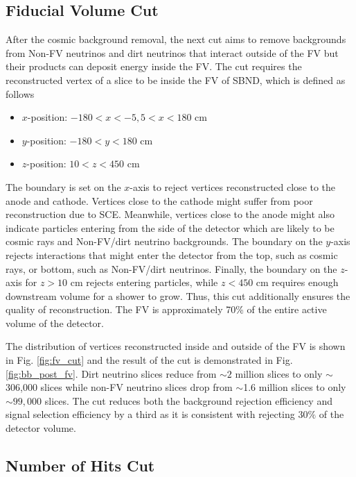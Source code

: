 \subsection{Fiducial Volume Cut}
\label{sec:fv_cut}

After the cosmic background removal, the next cut aims to remove backgrounds from Non-FV neutrinos and dirt neutrinos that interact outside of the FV but their products can deposit energy inside the FV. 
The cut requires the reconstructed vertex of a slice to be inside the FV of SBND, which is  defined as follows
\begin{itemize}
        \item $x$-position: $- 180 < x < -5 , 5 < x < 180$ cm
        \item $y$-position: $-180 < y < 180$ cm
        \item $z$-position: $10 < z < 450$ cm
\end{itemize}
The boundary is set on the $x$-axis to reject vertices reconstructed close to the anode and cathode.
Vertices close to the cathode might suffer from poor reconstruction due to SCE.
Meanwhile, vertices close to the anode might also indicate particles entering from the side of the detector which are likely to be cosmic rays and Non-FV/dirt neutrino backgrounds. 
The boundary on the $y$-axis rejects interactions that might enter the detector from the top, such as cosmic rays, or bottom, such as Non-FV/dirt neutrinos.
Finally, the boundary on the $z$-axis for $z > 10$ cm rejects entering particles, while $z < 450$ cm requires enough downstream volume for a shower to grow.
Thus, this cut additionally ensures the quality of reconstruction.
The FV is approximately 70\% of the entire active volume of the detector.

The distribution of vertices reconstructed inside and outside of the FV is shown in Fig. \ref{fig:fv_cut} and the result of the cut is demonstrated in Fig. \ref{fig:bb_post_fv}.
Dirt neutrino slices reduce from $\sim2$ million slices to only $\sim$306,000 slices while non-FV neutrino slices drop from $\sim$1.6 million slices to only $\sim99,000$ slices.
The cut reduces both the background rejection efficiency and signal selection efficiency by a third as it is consistent with rejecting $30\%$ of the detector volume.

\subsection{Number of Hits Cut}

